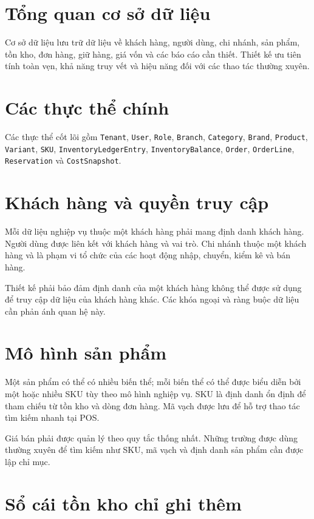 \section{Tổng quan cơ sở dữ liệu}

Cơ sở dữ liệu lưu trữ dữ liệu về khách hàng, người dùng, chi nhánh, sản phẩm, tồn kho, đơn hàng,
giữ hàng, giá vốn và các báo cáo cần thiết. Thiết kế ưu tiên tính toàn vẹn, khả năng truy vết
và hiệu năng đối với các thao tác thường xuyên.

\section{Các thực thể chính}

Các thực thể cốt lõi gồm \texttt{Tenant}, \texttt{User}, \texttt{Role}, \texttt{Branch},
\texttt{Category}, \texttt{Brand}, \texttt{Product}, \texttt{Variant}, \texttt{SKU},
\texttt{InventoryLedgerEntry}, \texttt{InventoryBalance}, \texttt{Order}, \texttt{OrderLine},
\texttt{Reservation} và \texttt{CostSnapshot}.

\section{Khách hàng và quyền truy cập}

Mỗi dữ liệu nghiệp vụ thuộc một khách hàng phải mang định danh khách hàng. Người dùng được
liên kết với khách hàng và vai trò. Chi nhánh thuộc một khách hàng và là phạm vi tổ chức của
các hoạt động nhập, chuyển, kiểm kê và bán hàng.

Thiết kế phải bảo đảm định danh của một khách hàng không thể được sử dụng để truy cập dữ liệu
của khách hàng khác. Các khóa ngoại và ràng buộc dữ liệu cần phản ánh quan hệ này.

\section{Mô hình sản phẩm}

Một sản phẩm có thể có nhiều biến thể; mỗi biến thể có thể được biểu diễn bởi một hoặc nhiều
SKU tùy theo mô hình nghiệp vụ. SKU là định danh ổn định để tham chiếu từ tồn kho và dòng đơn
hàng. Mã vạch được lưu để hỗ trợ thao tác tìm kiếm nhanh tại POS.

Giá bán phải được quản lý theo quy tắc thống nhất. Những trường được dùng thường xuyên để tìm
kiếm như SKU, mã vạch và định danh sản phẩm cần được lập chỉ mục.

\section{Sổ cái tồn kho chỉ ghi thêm}

